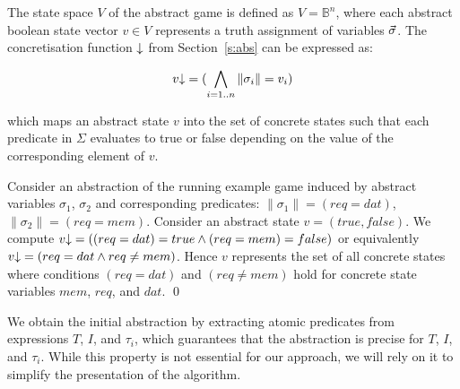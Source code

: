The state space $V$ of the abstract game is defined as $V = \mathbb{B}^n$, where each abstract boolean state vector $v\in V$ represents a truth assignment of variables $\vec{\sigma}$. The concretisation function $\mathord{\downarrow}$ from Section~\ref{s:abs} can be expressed as: 

\begin{equation}
v\mathord{\downarrow}=(\bigwedge_{i=1..n}\|\sigma_i\|=v_i)
\end{equation}

\noindent which maps an abstract state $v$ into the set of concrete states such that each predicate in $\Sigma$ evaluates to true or false depending on the value of the corresponding element of $v$.

\begin{ex}
    \everymath{\mathtt{\xdef\tmp{\fam\the\fam\relax}\aftergroup\tmp}}
    \everydisplay{\mathtt{\xdef\tmp{\fam\the\fam\relax}\aftergroup\tmp}}
    Consider an abstraction of the running example game induced by abstract variables $\sigma_1$, $\sigma_2$ and corresponding predicates: $\|\sigma_1\| = (req=dat)$, $\|\sigma_2\| = (req = mem)$.  Consider an abstract state $v=(true,false)$. We compute $v\mathord{\downarrow} = ((req=dat) = true \land (req = mem)=false)$ or equivalently $v\mathord{\downarrow} = (req=dat \land req \neq mem)$.  Hence $v$ represents the set of all concrete states where conditions $(req=dat)$ and  $(req \neq mem)$ hold for concrete state variables $mem$, $req$, and $dat$.
    \qed
\end{ex}

We obtain the initial abstraction by extracting atomic predicates from expressions $T$, $I$, and $\tau_i$, which guarantees that the abstraction is precise for $T$, $I$, and $\tau_i$. While this property is not essential for our approach, we will rely on it to simplify the presentation of the algorithm.

%

